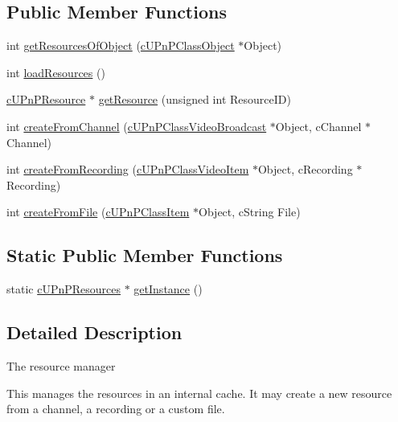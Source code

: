 \subsection*{Public Member Functions}
\begin{CompactItemize}
\item 
int \hyperlink{classcUPnPResources_5da9137336fa284040a823f53267b837}{getResourcesOfObject} (\hyperlink{classcUPnPClassObject}{cUPnPClassObject} $\ast$Object)
\item 
int \hyperlink{classcUPnPResources_eaffc72ee9faeb046a41b965ce61507f}{loadResources} ()
\item 
\hyperlink{classcUPnPResource}{cUPnPResource} $\ast$ \hyperlink{classcUPnPResources_cfec64e65fa14c1efb653c9c4fbbc609}{getResource} (unsigned int ResourceID)
\item 
int \hyperlink{classcUPnPResources_974dd63afd52b87732800b7cf578a387}{createFromChannel} (\hyperlink{classcUPnPClassVideoBroadcast}{cUPnPClassVideoBroadcast} $\ast$Object, cChannel $\ast$Channel)
\item 
int \hyperlink{classcUPnPResources_47b243391bc9e1867bc16d4307f2af8a}{createFromRecording} (\hyperlink{classcUPnPClassVideoItem}{cUPnPClassVideoItem} $\ast$Object, cRecording $\ast$Recording)
\item 
int \hyperlink{classcUPnPResources_b2bac789a9caf023940dfc02a079c249}{createFromFile} (\hyperlink{classcUPnPClassItem}{cUPnPClassItem} $\ast$Object, cString File)
\end{CompactItemize}
\subsection*{Static Public Member Functions}
\begin{CompactItemize}
\item 
static \hyperlink{classcUPnPResources}{cUPnPResources} $\ast$ \hyperlink{classcUPnPResources_c3136b664928d2214e76e0e65a4ace6a}{getInstance} ()
\end{CompactItemize}


\subsection{Detailed Description}
The resource manager

This manages the resources in an internal cache. It may create a new resource from a channel, a recording or a custom file. 

